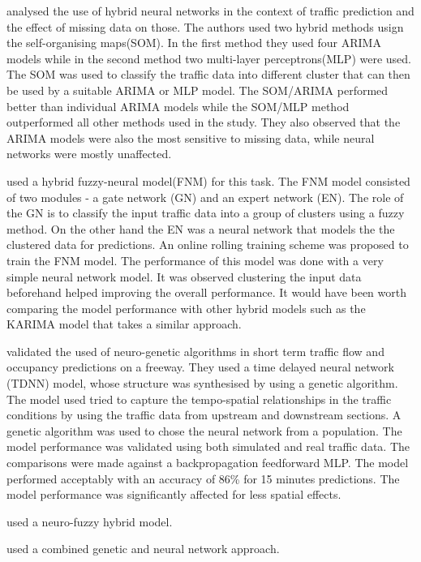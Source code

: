 \citet{chen2001study} analysed the use of hybrid neural networks in the context of traffic prediction
and the effect of missing data on those. The authors used two hybrid methods usign the self-organising
maps(SOM). In the first method they used four ARIMA models while in the second method two multi-layer
perceptrons(MLP) were used. The SOM was used to classify the traffic data into different cluster that
can then be used by a suitable ARIMA or MLP model. The SOM/ARIMA performed better than individual
ARIMA models while the SOM/MLP method outperformed all other methods used in the study. They also
observed that the ARIMA models were also the most sensitive to missing data, while neural networks
were mostly unaffected.

\citet{yin2002urban} used a hybrid fuzzy-neural model(FNM) for this task. The FNM model consisted of
two modules - a gate network (GN) and an expert network (EN). The role of the GN is to classify the
input traffic data into a group of clusters using a fuzzy method. On the other hand the EN was a
neural network that models the the clustered data for predictions. An online rolling training scheme
was proposed to train the FNM model. The performance of this model was done with a very simple neural
network model. It was observed clustering the input data beforehand helped improving the overall
performance. It would have been worth comparing the model performance with other hybrid models such
as the KARIMA model that takes a similar approach.

\citet{abdulhai2002short} validated the used of neuro-genetic algorithms in short term traffic flow and
occupancy predictions on a freeway. They used a time delayed neural network (TDNN) model, whose
structure was synthesised by using a genetic algorithm. The model used tried to capture the
tempo-spatial relationships in the traffic conditions by using the traffic data from upstream and
downstream sections. A genetic algorithm was used to chose the neural network from a population. The
model performance was validated using both simulated and real traffic data. The comparisons were made
against a backpropagation feedforward MLP. The model performed acceptably with an accuracy of 86\% for
15 minutes predictions. The model performance was significantly affected for less spatial effects.

\citet{ishak2004optimizing} used a neuro-fuzzy hybrid model.

\citet{vlahogianni2005optimized} used a combined genetic and neural network approach.

